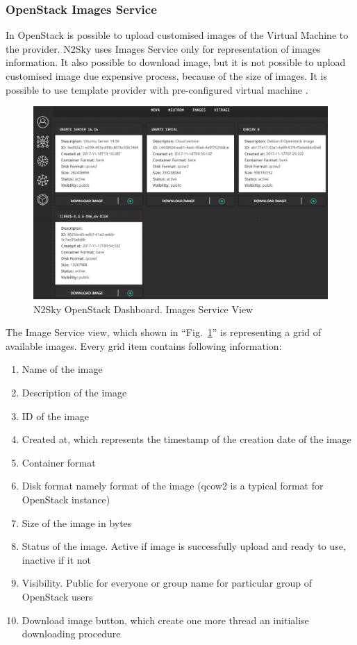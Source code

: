 \subsubsection{OpenStack Images Service}\label{OpenStack Images Service}

In OpenStack is possible to upload customised images of the Virtual Machine to the provider. N2Sky uses Images Service only for representation of images information. It also possible to download image, but it is not possible to upload customised image due expensive process, because of the size of images. It is possible to use template provider with pre-configured virtual machine \cite{images}. 


\begin{figure}[htbp]
\begin{center}
  \includegraphics[width=\linewidth]{components/4/pics/openstack_images.png}
  \caption{N2Sky OpenStack Dashboard. Images Service View}
  \label{fig:openstack_images}
\end{center}
\end{figure}

The Image Service view, which shown in ``Fig.~\ref{fig:openstack_images}'' is representing a grid of available images. Every grid item contains following information: 
\begin{enumerate}
\item Name of the image
\item Description of the image
\item ID of the image
\item Created at, which represents the timestamp of the creation date of the image
\item Container format
\item Disk format namely format of the image (qcow2 is a typical format for OpenStack instance)
\item Size of the image in bytes
\item Status of the image. Active if image is successfully upload and ready to use, inactive if it not
\item Visibility. Public for everyone or group name for particular group of OpenStack users
\item Download image button, which create one more thread an initialise downloading procedure
\end{enumerate}

